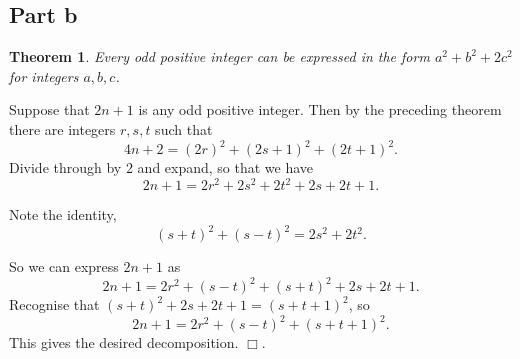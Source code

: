 \documentclass[10pt]{article}
\newtheorem{theorem}{Theorem}
\newenvironment{proof}[1][Proof]{\begin{trivlist}
\item[\hskip \labelsep {\bfseries #1}]}{\end{trivlist}}
\begin{document}
    \subsection*{Part b}
    \begin{theorem}
        Every odd positive integer can be expressed in the form $a^2+b^2+2c^2$
        for integers $a,b,c$.
    \end{theorem}
    \begin{proof}
        Suppose that $2n+1$ is any odd positive integer. Then by the preceding
        theorem there are integers $r,s,t$ such that
        \begin{equation*}
            4n+2 = (2r)^2+(2s+1)^2+(2t+1)^2.
        \end{equation*}
        Divide through by $2$ and expand, so that we have
        \begin{equation*}
            2n+1 = 2r^2+2s^2+2t^2+2s+2t+1.
        \end{equation*}
        
        Note the identity,
        \begin{equation*}
            (s+t)^2+(s-t)^2 = 2s^2+2t^2.
        \end{equation*}
        
        So we can express $2n+1$ as
        \begin{equation*}
            2n+1 = 2r^2+(s-t)^2+(s+t)^2+2s+2t+1.
        \end{equation*}
        Recognise that $(s+t)^2+2s+2t+1 = (s+t+1)^2$, so 
        \begin{equation*}
            2n+1 = 2r^2+(s-t)^2+(s+t+1)^2.
        \end{equation*}
        This gives the desired decomposition. $\Box$.
    \end{proof} 
    
    
\end{document}
